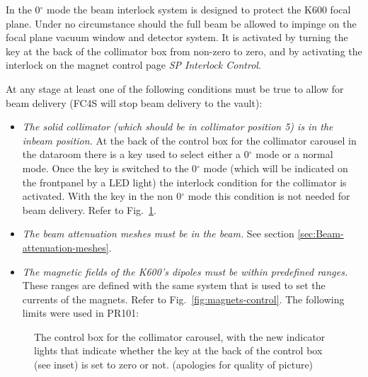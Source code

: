 \documentclass[11pt]{report}
\begin{document}
In the 0$^{\circ}$ mode the beam interlock system is designed to protect 
the K600 focal plane. Under no circumstance should the full beam 
be allowed to impinge on the focal plane vacuum window and detector system.
It is activated by turning the key at the back of the collimator box
from non-zero to zero, and by activating the interlock on the 
magnet control page {\it SP Interlock Control}.

At any stage at least one of the following conditions must be true to allow for
beam delivery (FC4S will stop beam delivery to the vault): 
\begin{itemize}
\item {\it The solid collimator (which should be in collimator position 5) is in the inbeam position.} \newline At the back of the control box for the collimator carousel in the dataroom there is a key used to select either a 0$^{\circ}$ mode or a normal mode. Once the key is switched to the 0$^{\circ}$ mode (which will be indicated on the frontpanel by a LED light) the interlock condition for the collimator is activated. With the key in the non 0$^{\circ}$ mode this condition is not needed for beam delivery. 
Refer to Fig.~\ref{fig:collimator-control}.
\item {\it The beam attenuation meshes must be in the beam.} \newline See section \ref{sec:Beam-attenuation-meshes}.
\item {\it The magnetic fields of the K600's dipoles must be within predefined ranges.}
\newline These ranges are defined with the same system that is used to set the currents of the magnets.  
Refer to Fig.~\ref{fig:magnets-control}.
The following limits were used in PR101:



\end{itemize}


\begin{figure}[!ht]
\centerline{\vspace{0cm}\hspace{0cm}
}
\centering
\caption{The control box for the collimator carousel, with the new indicator lights
that indicate whether the key at the back of the control box (see inset) is set to
zero or not. (apologies for quality of picture)}
\label{fig:collimator-control}
\end{figure} 
\end{document}
